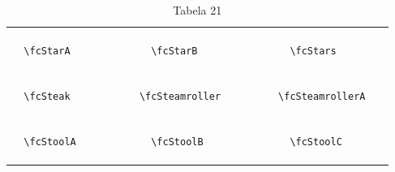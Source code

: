 \documentclass[x11names]{article}
\begin{document}
\begin{table}[H]
\begin{tabular}{|c|c|c|c|c|c|}
		&\multirow{5}{*}{	\fcStarA	[scale=0.16]} & &\multirow{5}{*}{	\fcStarB	[scale=0.16]} & &\multirow{5}{*}{	\fcStars	[scale=0.16]}\\	& & & & & \\	& & & & & \\	\verb|	\fcStarA	| & & \verb|	\fcStarB	| & & \verb|	\fcStars	| & \\	& & & & & \\	& & & & & \\	& & & & & \\	\hline									
		&\multirow{5}{*}{	\fcSteak	[scale=0.16]} & &\multirow{5}{*}{	\fcSteamroller	[scale=0.16]} & &\multirow{5}{*}{	\fcSteamrollerA	[scale=0.09]}\\	& & & & & \\	& & & & & \\	\verb|	\fcSteak	| & & \verb|	\fcSteamroller	| & & \verb|	\fcSteamrollerA	| & \\	& & & & & \\	& & & & & \\	& & & & & \\	\hline									
		&\multirow{5}{*}{	\fcStoolA	[scale=0.16]} & &\multirow{5}{*}{	\fcStoolB	[scale=0.16]} & &\multirow{5}{*}{	\fcStoolC	[scale=0.16]}\\	& & & & & \\	& & & & & \\	\verb|	\fcStoolA	| & & \verb|	\fcStoolB	| & & \verb|	\fcStoolC	| & \\	& & & & & \\	& & & & & \\	& & & & & \\		\hline 	\hline 	\end{tabular}	\caption{	Tabela 21	}\label{	Tab21	}\end{table}
\end{document}
